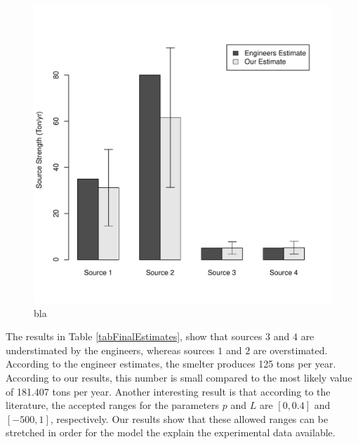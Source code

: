 \documentclass[12pt]{book}
\begin{document}
\begin{figure}[H]
\centering
\includegraphics[scale=0.5]{./FigChap4/qUncertainty}
\caption{bla}
\label{figQUnicertainty}
\end{figure}
The results in Table \ref{tabFinalEstimates}, show that sources $3$ and $4$ are understimated by the engineers,
whereas sources $1$ and $2$ are overstimated. According to the engineer estimates, the smelter produces
125 tons per year. According to our results, this number is small  compared to the most likely value
of 181.407 tons per year. Another interesting result is that according to the literature,
the accepted ranges for the parameters $p$ and $L$ are $[0,0.4]$ and $[-500,1]$, respectively.
Our results show that these allowed ranges can be stretched in order for the model the explain
the experimental data available. 







\end{document}
